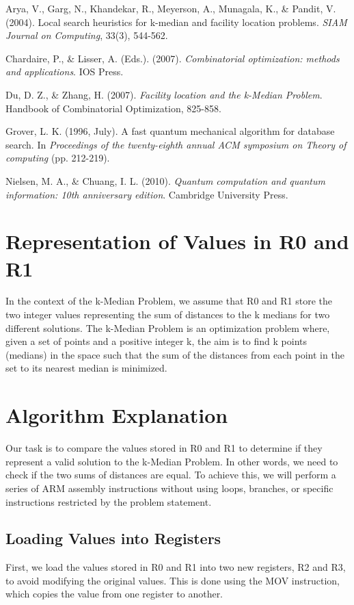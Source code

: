 \begin{thebibliography}{9}
Arya, V., Garg, N., Khandekar, R., Meyerson, A., Munagala, K., \& Pandit, V. (2004). Local search heuristics for k-median and facility location problems. \emph{SIAM Journal on Computing}, 33(3), 544-562.

Chardaire, P., \& Lisser, A. (Eds.). (2007). \emph{Combinatorial optimization: methods and applications}. IOS Press.

Du, D. Z., \& Zhang, H. (2007). \emph{Facility location and the k-Median Problem}. Handbook of Combinatorial Optimization, 825-858.

Grover, L. K. (1996, July). A fast quantum mechanical algorithm for database search. In \emph{Proceedings of the twenty-eighth annual ACM symposium on Theory of computing} (pp. 212-219).

Nielsen, M. A., \& Chuang, I. L. (2010). \emph{Quantum computation and quantum information: 10th anniversary edition}. Cambridge University Press.
\end{thebibliography}


\section{Representation of Values in R0 and R1}
In the context of the k-Median Problem, we assume that R0 and R1 store the two integer values representing the sum of distances to the k medians for two different solutions. The k-Median Problem is an optimization problem where, given a set of points and a positive integer k, the aim is to find k points (medians) in the space such that the sum of the distances from each point in the set to its nearest median is minimized.

\section{Algorithm Explanation}
Our task is to compare the values stored in R0 and R1 to determine if they represent a valid solution to the k-Median Problem. In other words, we need to check if the two sums of distances are equal. To achieve this, we will perform a series of ARM assembly instructions without using loops, branches, or specific instructions restricted by the problem statement.

\subsection{Loading Values into Registers}
First, we load the values stored in R0 and R1 into two new registers, R2 and R3, to avoid modifying the original values. This is done using the MOV instruction, which copies the value from one register to another.

